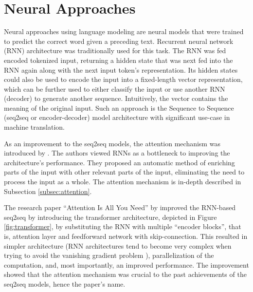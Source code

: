 \section{Neural Approaches}
\label{sec:neural_approaches}

Neural approaches using language modeling are neural models that were trained to predict the correct word given a preceding text.  %
Recurrent neural network (RNN) architecture was traditionally used for this task.
The RNN was fed encoded tokenized input, returning a hidden state that was next fed into the RNN again along with the next input token's representation.
Its hidden states could also be used to encode the input into a fixed-length vector representation, which can be further used to either classify the input or use another RNN (decoder) to generate another sequence.
Intuitively, the vector contains the meaning of the original input. 
Such an approach is the Sequence to Sequence (seq2seq or encoder-decoder) model architecture \citep{seq2seq} with significant use-case in machine translation.

As an improvement to the seq2seq models, the attention mechanism was introduced by \citet{first-attention}.
The authors viewed RNNs as a bottleneck to improving the architecture's performance.
They proposed an automatic method of enriching parts of the input with other relevant parts of the input, eliminating the need to process the input as a whole.
The attention mechanism is in-depth described in Subsection \ref{subsec:attention}.

The research paper ``Attention Is All You Need'' by \citet{attention-is-all-you-need} improved the RNN-based seq2seq by introducing the transformer architecture, depicted in Figure \ref{fig:transformer}, by substituting the RNN with multiple ``encoder blocks'', that is, attention layer and feedforward network with skip-connection. 
This resulted in simpler architecture (RNN architectures tend to become very complex when trying to avoid the vanishing gradient problem \citep{vanishing-grad}), parallelization of the computation, and, most importantly, an improved performance. 
The improvement showed that the attention mechanism was crucial to the past achievements of the seq2seq models, hence the paper's name.

